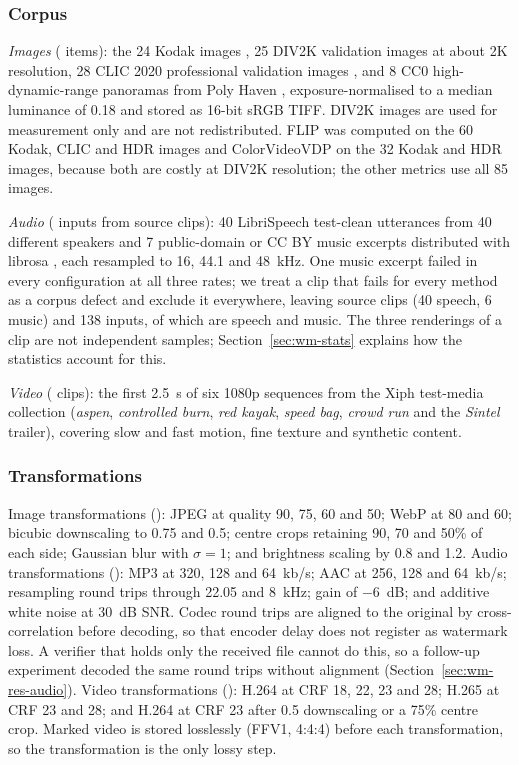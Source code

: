 \subsubsection{Corpus}
\emph{Images} ( items): the 24 Kodak images \cite{kodak}, 25 DIV2K validation images \cite{agustsson2017div2k} at about 2K resolution, 28 CLIC 2020 professional validation images \cite{clic}, and 8 CC0 high-dynamic-range panoramas from Poly Haven \cite{polyhaven}, exposure-normalised to a median luminance of 0.18 and stored as 16-bit sRGB TIFF. DIV2K images are used for measurement only and are not redistributed. FLIP was computed on the 60 Kodak, CLIC and HDR images and ColorVideoVDP on the 32 Kodak and HDR images, because both are costly at DIV2K resolution; the other metrics use all 85 images.

\emph{Audio} ( inputs from  source clips): 40 LibriSpeech test-clean utterances from 40 different speakers \cite{panayotov2015librispeech} and 7 public-domain or CC BY music excerpts distributed with librosa \cite{mcfee2015librosa}, each resampled to 16, 44.1 and 48~kHz. One music excerpt failed in every configuration at all three rates; we treat a clip that fails for every method as a corpus defect and exclude it everywhere, leaving  source clips (40 speech, 6 music) and 138 inputs, of which  are speech and  music. The three renderings of a clip are not independent samples; Section~\ref{sec:wm-stats} explains how the statistics account for this.

\emph{Video} ( clips): the first 2.5~s of six 1080p sequences from the Xiph test-media collection \cite{xiphderf} (\emph{aspen}, \emph{controlled burn}, \emph{red kayak}, \emph{speed bag}, \emph{crowd run} and the \emph{Sintel} trailer), covering slow and fast motion, fine texture and synthetic content.

\subsubsection{Transformations}
Image transformations (): JPEG at quality 90, 75, 60 and 50; WebP at 80 and 60; bicubic downscaling to 0.75 and 0.5; centre crops retaining 90, 70 and 50\% of each side; Gaussian blur with $\sigma=1$; and brightness scaling by 0.8 and 1.2. Audio transformations (): MP3 at 320, 128 and 64~kb/s; AAC at 256, 128 and 64~kb/s; resampling round trips through 22.05 and 8~kHz; gain of $-6$~dB; and additive white noise at 30~dB SNR. Codec round trips are aligned to the original by cross-correlation before decoding, so that encoder delay does not register as watermark loss. A verifier that holds only the received file cannot do this, so a follow-up experiment decoded the same round trips without alignment (Section~\ref{sec:wm-res-audio}). Video transformations (): H.264 at CRF 18, 22, 23 and 28; H.265 at CRF 23 and 28; and H.264 at CRF 23 after 0.5 downscaling or a 75\% centre crop. Marked video is stored losslessly (FFV1, 4:4:4) before each transformation, so the transformation is the only lossy step.

